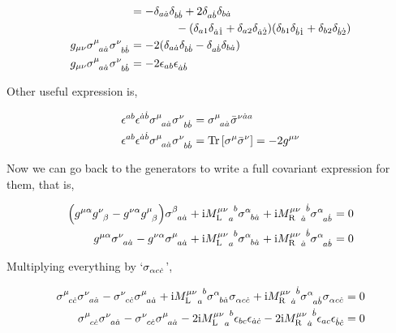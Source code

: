 \begin{align}
    &=-\delta_{a\dot a}\delta_{b\dot b}+2\delta_{a\dot b}\delta_{b\dot a}\nonumber\\
    &\quad\quad\quad\quad-\qty(\delta_{a1}\delta_{\dot a\dot 1}+\delta_{a2}\delta_{\dot a\dot 2})\qty(\delta_{b1}\delta_{\dot b\dot 1}+\delta_{b2}\delta_{\dot b\dot 2})\nonumber\\
    g_{\mu\nu}\tensor{\sigma}{^\mu_a_{\dot a}}\tensor{\sigma}{^\nu_b_{\dot b}}&=-2\qty(\delta_{a\dot a}\delta_{b\dot b}-\delta_{a\dot b}\delta_{b\dot a})\nonumber\\
    g_{\mu\nu}\tensor{\sigma}{^\mu_a_{\dot a}}\tensor{\sigma}{^\nu_b_{\dot b}}&=-2\epsilon_{ab}\epsilon_{\dot a\dot b}\nonumber
\end{align}

Other useful expression is,

\begin{align}
    \epsilon^{ab}\epsilon^{\dot a\dot b}\tensor{\sigma}{^\mu_a_{\dot a}}\tensor{\sigma}{^\nu_b_{\dot b}}&=\tensor{\sigma}{^\mu_a_{\dot a}}\tensor{{\bar\sigma}}{^\nu^{\dot a}^a}\nonumber\\
    \epsilon^{ab}\epsilon^{\dot a\dot b}\tensor{\sigma}{^\mu_a_{\dot a}}\tensor{\sigma}{^\nu_b_{\dot b}}&=\Tr\qty[\sigma^\mu{\bar\sigma}^\nu]=-2g^{\mu\nu}\nonumber
\end{align}

Now we can go back to the generators to write a full covariant expression for them, that is,

\begin{align}
    \qty(g^{\mu\alpha}\tensor{g}{^\nu_\beta}- g^{\nu\alpha}\tensor{g}{^\mu_\beta})\tensor{\sigma}{^\beta_a_{\dot a}}+\im\tensor{{{M_{\textnormal L}^{\mu\nu}}}}{_a^b}\tensor{\sigma}{^\alpha_b_{\dot a}}+\im\tensor{{{M_{\textnormal R}^{\mu\nu}}}}{_{\dot a}^{\dot b}}\tensor{\sigma}{^\alpha_a_{\dot b}}&=0\nonumber\\
    g^{\mu\alpha}\tensor{\sigma}{^\nu_a_{\dot a}}- g^{\nu\alpha}\tensor{\sigma}{^\mu_a_{\dot a}}+\im\tensor{{{M_{\textnormal L}^{\mu\nu}}}}{_a^b}\tensor{\sigma}{^\alpha_b_{\dot a}}+\im\tensor{{{M_{\textnormal R}^{\mu\nu}}}}{_{\dot a}^{\dot b}}\tensor{\sigma}{^\alpha_a_{\dot b}}&=0\nonumber
\end{align}

Multiplying everything by `$\tensor{\sigma}{_\alpha_c_{\dot c}}$', 

\begin{align}
    \tensor{\sigma}{^\mu_c_{\dot c}}\tensor{\sigma}{^\nu_a_{\dot a}}- \tensor{\sigma}{^\nu_c_{\dot c}}\tensor{\sigma}{^\mu_a_{\dot a}}+\im\tensor{{{M_{\textnormal L}^{\mu\nu}}}}{_a^b}\tensor{\sigma}{^\alpha_b_{\dot a}}\tensor{\sigma}{_\alpha_c_{\dot c}}+\im\tensor{{{M_{\textnormal R}^{\mu\nu}}}}{_{\dot a}^{\dot b}}\tensor{\sigma}{^\alpha_a_{\dot b}}\tensor{\sigma}{_\alpha_c_{\dot c}}&=0\nonumber\\
    \tensor{\sigma}{^\mu_c_{\dot c}}\tensor{\sigma}{^\nu_a_{\dot a}}- \tensor{\sigma}{^\nu_c_{\dot c}}\tensor{\sigma}{^\mu_a_{\dot a}}-2\im\tensor{{{M_{\textnormal L}^{\mu\nu}}}}{_a^b}\epsilon_{bc}\epsilon_{\dot a\dot c}-2\im\tensor{{{M_{\textnormal R}^{\mu\nu}}}}{_{\dot a}^{\dot b}}\epsilon_{ac}\epsilon_{\dot b\dot c}&=0\nonumber
\end{align}

